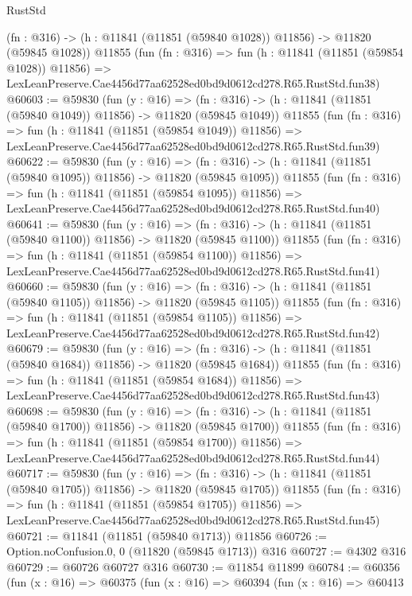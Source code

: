 \begin{lexlean}{RustStd}
\begin{coremodule}
    (fn : @316) -> (h : @11841 (@11851 (@59840 @1028)) @11856) -> @11820 (@59845 @1028))
    @11855
    (fun (fn : @316) =>
    fun (h : @11841 (@11851 (@59854 @1028)) @11856) =>
    LexLeanPreserve.Cae4456d77aa62528ed0bd9d0612cd278.R65.RustStd.fun38)
@60603 := @59830
    (fun (y : @16) =>
    (fn : @316) -> (h : @11841 (@11851 (@59840 @1049)) @11856) -> @11820 (@59845 @1049))
    @11855
    (fun (fn : @316) =>
    fun (h : @11841 (@11851 (@59854 @1049)) @11856) =>
    LexLeanPreserve.Cae4456d77aa62528ed0bd9d0612cd278.R65.RustStd.fun39)
@60622 := @59830
    (fun (y : @16) =>
    (fn : @316) -> (h : @11841 (@11851 (@59840 @1095)) @11856) -> @11820 (@59845 @1095))
    @11855
    (fun (fn : @316) =>
    fun (h : @11841 (@11851 (@59854 @1095)) @11856) =>
    LexLeanPreserve.Cae4456d77aa62528ed0bd9d0612cd278.R65.RustStd.fun40)
@60641 := @59830
    (fun (y : @16) =>
    (fn : @316) -> (h : @11841 (@11851 (@59840 @1100)) @11856) -> @11820 (@59845 @1100))
    @11855
    (fun (fn : @316) =>
    fun (h : @11841 (@11851 (@59854 @1100)) @11856) =>
    LexLeanPreserve.Cae4456d77aa62528ed0bd9d0612cd278.R65.RustStd.fun41)
@60660 := @59830
    (fun (y : @16) =>
    (fn : @316) -> (h : @11841 (@11851 (@59840 @1105)) @11856) -> @11820 (@59845 @1105))
    @11855
    (fun (fn : @316) =>
    fun (h : @11841 (@11851 (@59854 @1105)) @11856) =>
    LexLeanPreserve.Cae4456d77aa62528ed0bd9d0612cd278.R65.RustStd.fun42)
@60679 := @59830
    (fun (y : @16) =>
    (fn : @316) -> (h : @11841 (@11851 (@59840 @1684)) @11856) -> @11820 (@59845 @1684))
    @11855
    (fun (fn : @316) =>
    fun (h : @11841 (@11851 (@59854 @1684)) @11856) =>
    LexLeanPreserve.Cae4456d77aa62528ed0bd9d0612cd278.R65.RustStd.fun43)
@60698 := @59830
    (fun (y : @16) =>
    (fn : @316) -> (h : @11841 (@11851 (@59840 @1700)) @11856) -> @11820 (@59845 @1700))
    @11855
    (fun (fn : @316) =>
    fun (h : @11841 (@11851 (@59854 @1700)) @11856) =>
    LexLeanPreserve.Cae4456d77aa62528ed0bd9d0612cd278.R65.RustStd.fun44)
@60717 := @59830
    (fun (y : @16) =>
    (fn : @316) -> (h : @11841 (@11851 (@59840 @1705)) @11856) -> @11820 (@59845 @1705))
    @11855
    (fun (fn : @316) =>
    fun (h : @11841 (@11851 (@59854 @1705)) @11856) =>
    LexLeanPreserve.Cae4456d77aa62528ed0bd9d0612cd278.R65.RustStd.fun45)
@60721 := @11841 (@11851 (@59840 @1713)) @11856
@60726 := Option.noConfusion.{0, 0} (@11820 (@59845 @1713)) @316
@60727 := @4302 @316
@60729 := @60726 @60727 @316
@60730 := @11854 @11899
@60784 := @60356
    (fun (x : @16) =>
    @60375
      (fun (x : @16) =>
      @60394
        (fun (x : @16) =>
        @60413

\end{coremodule}
\end{lexlean}
